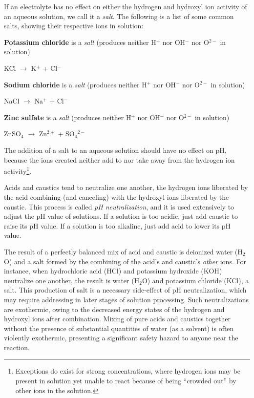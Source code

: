 \vskip 10pt

\filbreak

If an electrolyte has no effect on either the hydrogen and hydroxyl ion activity of an aqueous solution, we call it a \textit{salt}.  The following is a list of some common salts, showing their respective ions in solution: 

\vskip 10pt

\noindent
\textbf{Potassium chloride} is a \textit{salt} (produces neither H$^{+}$ nor OH$^{-}$ nor O$^{2-}$ in solution)

KCl $\to$ K$^{+}$ + Cl$^{-}$

\vskip 10pt

\noindent
\textbf{Sodium chloride} is a \textit{salt} (produces neither H$^{+}$ nor OH$^{-}$ nor O$^{2-}$ in solution)

NaCl $\to$ Na$^{+}$ + Cl$^{-}$

\vskip 10pt

\noindent
\textbf{Zinc sulfate} is a \textit{salt} (produces neither H$^{+}$ nor OH$^{-}$ nor O$^{2-}$ in solution)

ZnSO$_{4}$ $\to$ Zn$^{2+}$ + SO$_{4}$$^{2-}$

\vskip 10pt

The addition of a salt to an aqueous solution should have no effect on pH, because the ions created neither add to nor take away from the hydrogen ion activity\footnote{Exceptions do exist for strong concentrations, where hydrogen ions may be present in solution yet unable to react because of being ``crowded out'' by other ions in the solution.}.

\vskip 10pt

\filbreak

Acids and caustics tend to neutralize one another, the hydrogen ions liberated by the acid combining (and canceling) with the hydroxyl ions liberated by the caustic.  This process is called \textit{pH neutralization}, and it is used extensively to adjust the pH value of solutions.  If a solution is too acidic, just add caustic to raise its pH value.  If a solution is too alkaline, just add acid to lower its pH value.    

The result of a perfectly balanced mix of acid and caustic is deionized water (H$_{2}$O) and a salt formed by the combining of the acid's and caustic's \textit{other} ions.  For instance, when hydrochloric acid (HCl) and potassium hydroxide (KOH) neutralize one another, the result is water (H$_{2}$O) and potassium chloride (KCl), a salt.  This production of salt is a necessary side-effect of pH neutralization, which may require addressing in later stages of solution processing.  Such neutralizations are exothermic, owing to the decreased energy states of the hydrogen and hydroxyl ions after combination.  Mixing of pure acids and caustics together without the presence of substantial quantities of water (as a solvent) is often violently exothermic, presenting a significant safety hazard to anyone near the reaction.  

